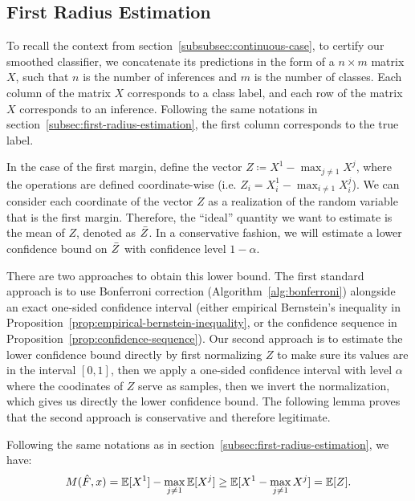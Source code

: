 \subsection{First Radius Estimation}\label{subsec:first-radius-estimation-continuous}
To recall the context from section~\ref{subsubsec:continuous-case}, to certify our smoothed classifier, we concatenate its predictions in the form of a $n \times m$ matrix $X$, such that $n$ is the number of inferences and $m$ is the number of classes.
Each column of the matrix $X$ corresponds to a class label, and each row of the matrix $X$ corresponds to an inference.
Following the same notations in section~\ref{subsec:first-radius-estimation}, the first column corresponds to the true label.

In the case of the first margin, define the vector $Z\coloneqq X^{1}-\max_{j \neq 1} X^{j}$, where the operations are defined coordinate-wise (i.e. $Z_i = X^{1}_i - \max_{i \neq 1} X^{j}_i$).
We can consider each coordinate of the vector $Z$ as a realization of the random variable that is the first margin.
Therefore, the ``ideal'' quantity we want to estimate is the mean of $Z$, denoted as $\Bar{Z}$.
In a conservative fashion, we will estimate a lower confidence bound on $\Bar{Z}$ with confidence level $1-\alpha$.

There are two approaches to obtain this lower bound.
The first standard approach is to use Bonferroni correction (Algorithm~\ref{alg:bonferroni}) alongside an exact one-sided confidence interval (either empirical Bernstein's inequality in Proposition~\ref{prop:empirical-bernstein-inequality}, or the confidence sequence in Proposition~\ref{prop:confidence-sequence}).
Our second approach is to estimate the lower confidence bound directly by first normalizing $Z$ to make sure its values are in the interval $[0,1]$, then we apply a one-sided confidence interval with level $\alpha$ where the coodinates of $Z$ serve as samples, then we invert the normalization, which gives us directly the lower confidence bound.
The following lemma proves that the second approach is conservative and therefore legitimate.
\begin{lemma}
    \label{lemma:jensen-approximation}
    Following the same notations as in section~\ref{subsec:first-radius-estimation}, we have:
    \begin{equation}
        M(\Hat{F},x) =\mathbb{E}[X^1] - \max_{j \neq 1}\mathbb{E}[X^j]\geq \mathbb{E}[X^1-\max_{j \neq 1}X^j] = \mathbb{E}[Z].
    \end{equation}
\end{lemma}


